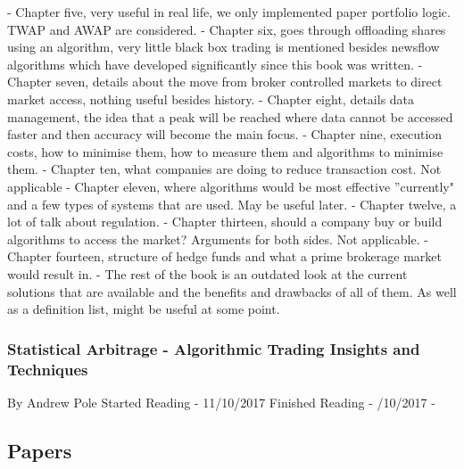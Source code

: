 \documentclass[12pt,a4paper]{article}
\begin{document}
- Chapter five, very useful in real life, we only implemented paper portfolio logic. TWAP and AWAP are considered. \newline
- Chapter six, goes through offloading shares using an algorithm, very little black box trading is mentioned besides newsflow algorithms which have developed significantly since this book was written. \newline
- Chapter seven, details about the move from broker controlled markets to direct market access, nothing useful besides history. \newline
- Chapter eight, details data management, the idea that a peak will be reached where data cannot be accessed faster and then accuracy will become the main focus. \newline
- Chapter nine, execution costs, how to minimise them, how to measure them and algorithms to minimise them. \newline
- Chapter ten, what companies are doing to reduce transaction cost. Not applicable \newline
- Chapter eleven, where algorithms would be most effective ''currently" and a few types of systems that are used. May be useful later. \newline
- Chapter twelve, a lot of talk about regulation. \newline
- Chapter thirteen, should a company buy or build algorithms to access the market? Arguments for both sides. Not applicable. \newline
- Chapter fourteen, structure of hedge funds and what a prime brokerage market would result in. \newline
- The rest of the book is an outdated look at the current solutions that are available and the benefits and drawbacks of all of them. As well as a definition list, might be useful at some point.

\subsubsection*{Statistical Arbitrage - Algorithmic Trading Insights and Techniques}
By Andrew Pole \newline
Started Reading - 11/10/2017 \newline
Finished Reading -  /10/2017 \newline
\newline
- 

\subsection*{Papers}
\end{document}
